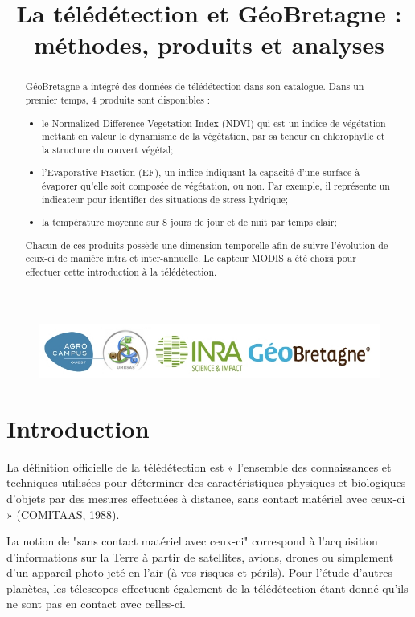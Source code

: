 \documentclass[10pt,a4paper]{article}
\title{La télédétection et GéoBretagne : méthodes, produits et analyses}
\begin{document}
\maketitle

\begin{figure}[t!]
\centering
\includegraphics[scale=1]{img/logos.jpg}
\label{logos}
\end{figure}

\begin{abstract}
GéoBretagne a intégré des données de télédétection dans son catalogue. Dans un premier temps, 4 produits sont disponibles : 
\begin{itemize}
\item le Normalized Difference Vegetation Index (NDVI) qui est un indice de végétation mettant en valeur le dynamisme de la végétation, par sa teneur en chlorophylle et la structure du couvert végétal;
\item l'Evaporative Fraction (EF), un indice indiquant la capacité d'une surface à évaporer qu’elle soit composée de végétation, ou non. Par exemple, il représente un indicateur pour identifier des situations de stress hydrique;
\item la température moyenne sur 8 jours de jour et de nuit par temps clair;
\end{itemize}

Chacun de ces produits possède une dimension temporelle afin de suivre l'évolution de ceux-ci de manière intra et inter-annuelle. Le capteur MODIS a été choisi pour effectuer cette introduction à la télédétection.
\end{abstract}

\newpage
\tableofcontents
\newpage

\section{Introduction}

La définition officielle de la télédétection est « l’ensemble des connaissances et techniques utilisées pour déterminer des caractéristiques physiques et biologiques d’objets par des mesures effectuées à distance, sans contact matériel avec ceux-ci » (COMITAAS, 1988).\smallbreak

La notion de "sans contact matériel avec ceux-ci" correspond à l'acquisition d'informations sur la Terre à partir de satellites, avions, drones ou simplement d'un appareil photo jeté en l'air (à vos risques et périls). Pour l'étude d'autres planètes, les télescopes effectuent également de la télédétection étant donné qu'ils ne sont pas en contact avec celles-ci.\smallbreak
\end{document}
